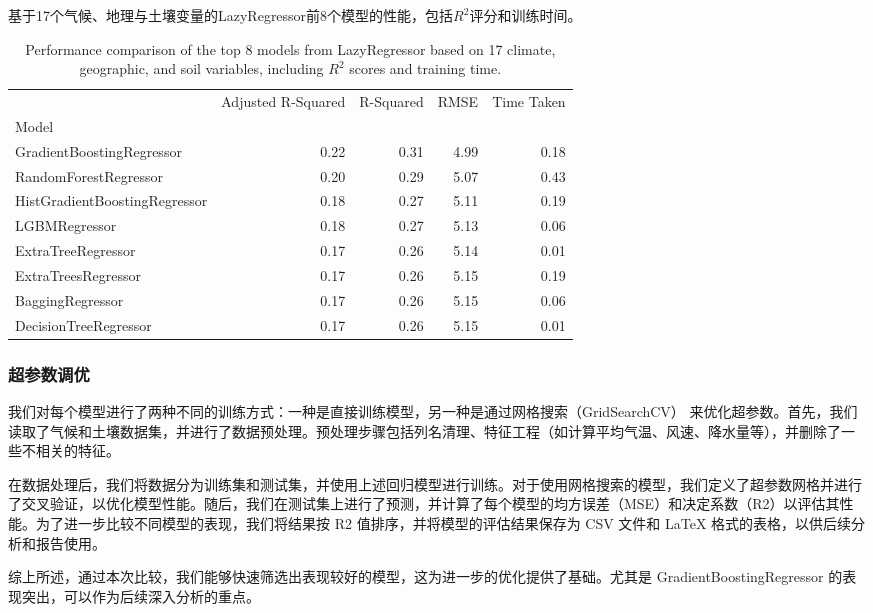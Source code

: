 \documentclass[AutoFakeBold]{LZUThesis-PgD&PhD}
\begin{document}
	\begin{table}[H]
		\centering
		\caption{基于17个气候、地理与土壤变量的LazyRegressor前8个模型的性能，包括$R^2$评分和训练时间。}
		\caption*{Performance comparison of the top 8 models from LazyRegressor based on 17 climate, geographic, and soil variables, including $R^2$ scores and training time.}
		
		\begin{tabular}{lrrrr}
			\toprule
			& Adjusted R-Squared & R-Squared & RMSE & Time Taken \\
			Model &  &  &  &  \\
			\midrule
			GradientBoostingRegressor & 0.22 & 0.31 & 4.99 & 0.18 \\
			RandomForestRegressor & 0.20 & 0.29 & 5.07 & 0.43 \\
			HistGradientBoostingRegressor & 0.18 & 0.27 & 5.11 & 0.19 \\
			LGBMRegressor & 0.18 & 0.27 & 5.13 & 0.06 \\
			ExtraTreeRegressor & 0.17 & 0.26 & 5.14 & 0.01 \\
			ExtraTreesRegressor & 0.17 & 0.26 & 5.15 & 0.19 \\
			BaggingRegressor & 0.17 & 0.26 & 5.15 & 0.06 \\
			DecisionTreeRegressor & 0.17 & 0.26 & 5.15 & 0.01 \\
			\bottomrule
		\end{tabular}
		\label{tab:models_performance}
	\end{table}
	
	\subsubsection{超参数调优}

	我们对每个模型进行了两种不同的训练方式：一种是直接训练模型，另一种是通过网格搜索（GridSearchCV）\cite{scikit-learn} 来优化超参数。首先，我们读取了气候和土壤数据集，并进行了数据预处理。预处理步骤包括列名清理、特征工程（如计算平均气温、风速、降水量等），并删除了一些不相关的特征。
	
	在数据处理后，我们将数据分为训练集和测试集，并使用上述回归模型进行训练。对于使用网格搜索的模型，我们定义了超参数网格并进行了交叉验证，以优化模型性能。随后，我们在测试集上进行了预测，并计算了每个模型的均方误差（MSE）和决定系数（R2）以评估其性能。为了进一步比较不同模型的表现，我们将结果按 R2 值排序，并将模型的评估结果保存为 CSV 文件和 LaTeX 格式的表格，以供后续分析和报告使用。
	
	综上所述，通过本次比较，我们能够快速筛选出表现较好的模型，这为进一步的优化提供了基础。尤其是 GradientBoostingRegressor 的表现突出，可以作为后续深入分析的重点。
	
\end{document}
